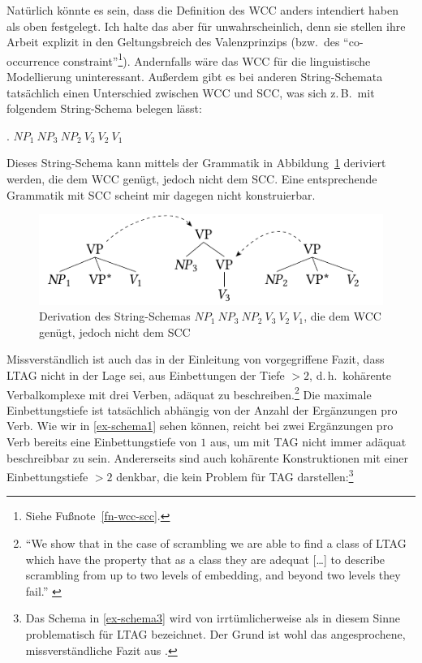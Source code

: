 Natürlich könnte es sein, dass \cite{Joshi:Becker:Rambow:00} die Definition des WCC anders intendiert haben als oben festgelegt. Ich halte das aber für unwahrscheinlich, denn sie stellen ihre Arbeit explizit in den Geltungsbreich des Valenzprinzips (bzw.\ des "`co-occurrence constraint"'\footnote{Siehe Fu\ss note~\ref{fn-wcc-scc}.}). Andernfalls wäre das WCC für die linguistische Modellierung uninteressant. Au\ss erdem gibt es bei anderen String-Schemata tatsächlich einen Unterschied zwischen WCC und SCC, was sich z.\,B.\ mit folgendem String-Schema belegen lässt:    

\ex. $\mathit{NP}_1 ~ \mathit{NP}_3 ~ \mathit{NP}_2 ~ V_3 ~ V_2 ~ V_1$\label{ex-schema-132}

Dieses String-Schema kann mittels der Grammatik in Abbildung~\ref{fig-schema-132} deriviert werden, die dem WCC genügt, jedoch nicht dem SCC. Eine entsprechende Grammatik mit SCC scheint mir dagegen nicht konstruierbar.
\begin{figure}[t]
\centering
\includegraphics{graphics/abb514.pdf}
\caption{\label{fig-schema-132}Derivation des String-Schemas $\mathit{NP}_1 ~ \mathit{NP}_3 ~ \mathit{NP}_2 ~ V_3 ~ V_2 ~ V_1$, die dem WCC genügt, jedoch nicht dem  SCC}
\end{figure}

Missverständlich ist auch das in der Einleitung von \cite{Joshi:Becker:Rambow:00} vorgegriffene Fazit, dass LTAG nicht in der Lage sei,  aus Einbettungen der Tiefe $>2$, d.\,h.\ kohärente Verbalkomplexe mit drei Verben, adäquat zu beschreiben.\footnote{"`We show that in the case of scrambling we are able to find a class of LTAG which have the property that as a class they are adequat [\ldots] to describe scrambling from up to two levels of embedding, and beyond two levels they fail."' \cite[167]{Joshi:Becker:Rambow:00}} Die maximale Einbettungstiefe ist tatsächlich abhängig von der Anzahl der Ergänzungen pro Verb. Wie wir in \ref{ex-schema1} sehen können, reicht bei zwei Ergänzungen pro Verb bereits eine Einbettungstiefe von $1$ aus, um mit TAG nicht immer adäquat beschreibbar zu sein. Andererseits sind auch kohärente Konstruktionen mit einer Einbettungstiefe $>2$ denkbar, die kein Problem für TAG darstellen:\footnote{Das Schema in \ref{ex-schema3} wird von \citet[190]{Kallmeyer:05} irrtümlicherweise als in diesem Sinne problematisch für LTAG bezeichnet. Der Grund ist wohl das angesprochene, missverständliche Fazit aus \citet[167]{Joshi:Becker:Rambow:00}.} 

